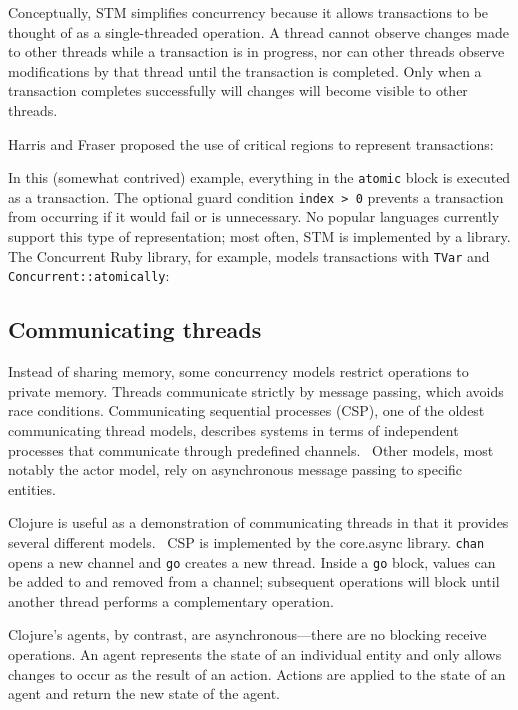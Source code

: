 \documentclass{sig-alternate}
\newcommand{\code}[1]{\texttt{#1}}
\begin{document}
Conceptually, STM simplifies concurrency because it allows transactions to be thought of as a single-threaded operation. A thread cannot observe changes made to other threads while a transaction is in progress, nor can other threads observe modifications by that thread until the transaction is completed. Only when a transaction completes successfully will changes will become visible to other threads.

Harris and Fraser proposed the use of critical regions to represent transactions:~\cite{Harris2014}

In this (somewhat contrived) example, everything in the \code{atomic} block is executed as a transaction. The optional guard condition \code{index > 0} prevents a transaction from occurring if it would fail or is unnecessary. No popular languages currently support this type of representation; most often, STM is implemented by a library. The Concurrent Ruby library, for example, models transactions with \code{TVar} and \code{Concurrent::atomically}:~\cite{ConcurrentRubyTVar}

\subsection{Communicating threads}

Instead of sharing memory, some concurrency models restrict operations to private memory. Threads communicate strictly by message passing, which avoids race conditions. Communicating sequential processes (CSP), one of the oldest communicating thread models, describes systems in terms of independent processes that communicate through predefined channels.~\cite{Hoare1978} Other models, most notably the actor model, rely on asynchronous message passing to specific entities.~\cite{Agha1986}

Clojure is useful as a demonstration of communicating threads in that it provides several different models.~\cite{Swalens2014} CSP is implemented by the core.async library. \code{chan} opens a new channel and \code{go} creates a new thread. Inside a \code{go} block, values can be added to and removed from a channel; subsequent operations will block until another thread performs a complementary operation.

Clojure's agents, by contrast, are asynchronous---there are no blocking receive operations. An agent represents the state of an individual entity and only allows changes to occur as the result of an action. Actions are applied to the state of an agent and return the new state of the agent.
\end{document}
